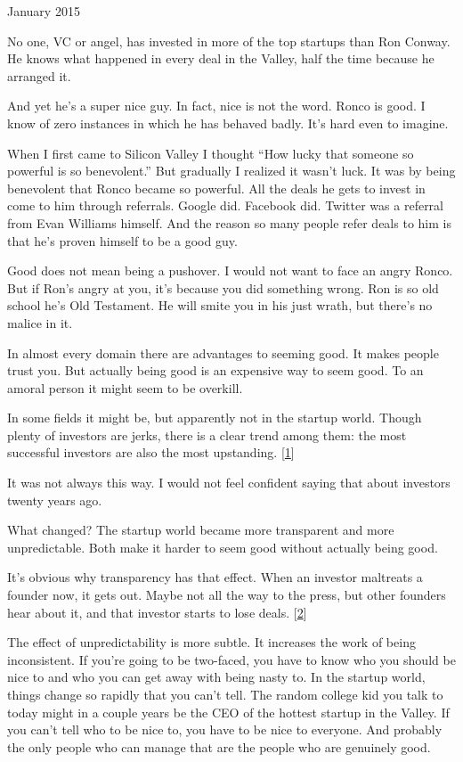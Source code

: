 January 2015

No one, VC or angel, has invested in more of the top startups than Ron
Conway. He knows what happened in every deal in the Valley, half the
time because he arranged it.

And yet he's a super nice guy. In fact, nice is not the word. Ronco is
good. I know of zero instances in which he has behaved badly. It's hard
even to imagine.

When I first came to Silicon Valley I thought ``How lucky that someone
so powerful is so benevolent.'' But gradually I realized it wasn't luck.
It was by being benevolent that Ronco became so powerful. All the deals
he gets to invest in come to him through referrals. Google did. Facebook
did. Twitter was a referral from Evan Williams himself. And the reason
so many people refer deals to him is that he's proven himself to be a
good guy.

Good does not mean being a pushover. I would not want to face an angry
Ronco. But if Ron's angry at you, it's because you did something wrong.
Ron is so old school he's Old Testament. He will smite you in his just
wrath, but there's no malice in it.

In almost every domain there are advantages to seeming good. It makes
people trust you. But actually being good is an expensive way to seem
good. To an amoral person it might seem to be overkill.

In some fields it might be, but apparently not in the startup world.
Though plenty of investors are jerks, there is a clear trend among them:
the most successful investors are also the most upstanding.
{[}\hyperref[f1n]{1}{]}

It was not always this way. I would not feel confident saying that about
investors twenty years ago.

What changed? The startup world became more transparent and more
unpredictable. Both make it harder to seem good without actually being
good.

It's obvious why transparency has that effect. When an investor
maltreats a founder now, it gets out. Maybe not all the way to the
press, but other founders hear about it, and that investor starts to
lose deals. {[}\hyperref[f2n]{2}{]}

The effect of unpredictability is more subtle. It increases the work of
being inconsistent. If you're going to be two-faced, you have to know
who you should be nice to and who you can get away with being nasty to.
In the startup world, things change so rapidly that you can't tell. The
random college kid you talk to today might in a couple years be the CEO
of the hottest startup in the Valley. If you can't tell who to be nice
to, you have to be nice to everyone. And probably the only people who
can manage that are the people who are genuinely good.


